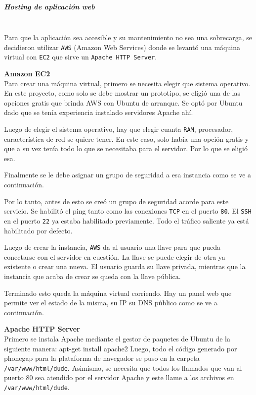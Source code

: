 \subparagraph{Hosting de aplicación web}\mbox{}\\
Para que la aplicación sea accesible y su mantenimiento no sea una sobrecarga, se decidieron utilizar \lstinline[columns=fixed]{AWS} (Amazon Web Services) donde se levantó una máquina virtual con \lstinline[columns=fixed]{EC2} que sirve un \lstinline[columns=fixed]{Apache HTTP Server}.

\textbf{Amazon EC2}\\
Para crear una máquina virtual, primero se necesita elegir que sistema operativo. En este proyecto, como solo se debe mostrar un prototipo, se eligió una de las opciones gratis que brinda AWS con Ubuntu de arranque. Se optó por Ubuntu dado que se tenía experiencia instalado servidores Apache ahí. 

Luego de elegir el sistema operativo, hay que elegir cuanta \lstinline[columns=fixed]{RAM}, procesador, característica de red se quiere tener. En este caso, solo había una opción gratis  y que a su vez tenía todo lo que se necesitaba para el servidor. Por lo que se eligió esa.

Finalmente se le debe asignar un grupo de seguridad a esa instancia como se ve a continuación.

Por lo tanto, antes de esto se creó un grupo de seguridad acorde para este servicio. Se habilitó el ping tanto como las conexiones \lstinline[columns=fixed]{TCP} en el puerto \lstinline[columns=fixed]{80}. El \lstinline[columns=fixed]{SSH} en el puerto \lstinline[columns=fixed]{22} ya estaba habilitado previamente. Todo el tráfico saliente ya está habilitado por defecto.

Luego de crear la instancia, \lstinline[columns=fixed]{AWS} da al usuario una llave para que pueda conectarse con el servidor en cuestión. La llave se puede elegir de otra ya existente o crear una nueva. El usuario guarda su llave privada, mientras que la instancia que acaba de crear se queda con la llave pública.

Terminado esto queda la máquina virtual corriendo. Hay un panel web que permite ver el estado de la misma, su IP su DNS público como se ve a continuación.

\textbf{Apache HTTP Server}\\
Primero se instala Apache mediante el gestor de paquetes de Ubuntu de la siguiente manera: 
apt-get install apache2
Luego, todo el código generado por phonegap para la plataforma de navegador se puso en la carpeta \lstinline[columns=fixed]{/var/www/html/dude}. Asimismo, se necesita que todos los llamados que van al puerto 80 sea atendido por el servidor Apache y este llame a los archivos en \lstinline[columns=fixed]{/var/www/html/dude}. 

